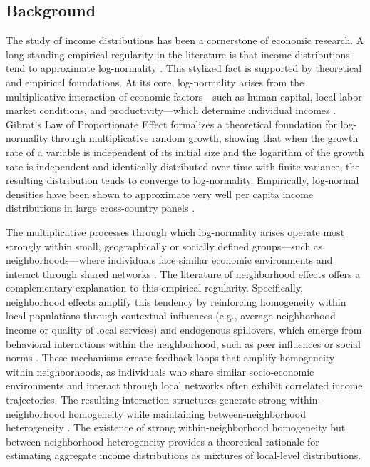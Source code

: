 
\subsection{Background}

The study of income distributions has been a cornerstone of economic research. A long-standing empirical regularity in the literature is that income distributions tend to approximate log-normality \citep{aitchison1957lognormal}. This stylized fact is supported by theoretical and empirical foundations. At its core, log-normality arises from the multiplicative interaction of economic factors—such as human capital, local labor market conditions, and productivity—which determine individual incomes \citep{neal2000theories}. Gibrat's Law of Proportionate Effect \citep{gibrat1931inegalites} formalizes a theoretical foundation for log-normality through multiplicative random growth, showing that when the growth rate of a variable is independent of its initial size and the logarithm of the growth rate is independent and identically distributed over time with finite variance, the resulting distribution tends to converge to log-normality. Empirically, log-normal densities have been shown to approximate very well per capita income distributions in large cross-country panels \citep{lopez2006normal}.

The multiplicative processes through which log-normality arises operate most strongly within small, geographically or socially defined groups—such as neighborhoods—where individuals face similar economic environments and interact through shared networks \citep{battistin2009consumption}. The literature of neighborhood effects offers a complementary explanation to this empirical regularity. Specifically, neighborhood effects amplify this tendency by reinforcing homogeneity within local populations through contextual influences (e.g., average neighborhood income or quality of local services) and endogenous spillovers, which emerge from behavioral interactions within the neighborhood, such as peer influences or social norms \citep{manski1993identification, durlauf1996neighborhoods}. These mechanisms create feedback loops that amplify homogeneity within neighborhoods, as individuals who share similar socio-economic environments and interact through local networks often exhibit correlated income trajectories. The resulting interaction structures generate strong within-neighborhood homogeneity while maintaining between-neighborhood heterogeneity \citep{durlauf2004neighborhood}. The existence of strong within-neighborhood homogeneity but between-neighborhood heterogeneity provides a theoretical rationale  for estimating aggregate income distributions as mixtures of local-level distributions.

